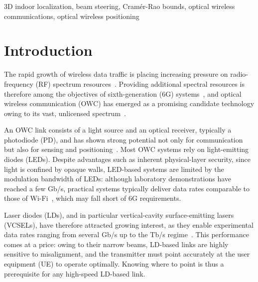 \documentclass[journal]{IEEEtran}
\begin{document}
\begin{IEEEkeywords} 
    3D indoor localization, beam steering, Cramér-Rao bounds, optical wireless communications, optical wireless positioning
\end{IEEEkeywords}


\section{Introduction}

The rapid growth of wireless data traffic is placing increasing
pressure on radio-frequency (RF) spectrum resources~\cite{Koonen2018}.
Providing additional spectral resources
is therefore among the objectives of sixth-generation (6G)
systems~\cite{Trevlakis2023}, and optical wireless communication (OWC) has
emerged as a promising candidate technology owing to its vast, unlicensed
spectrum~\cite{Kahn1997}.

An OWC link consists of a light source and an optical receiver, typically
a photodiode (PD), and has shown strong potential not only for
communication but also for sensing and
positioning~\cite{Zhu2025,Wang2024b}. Most OWC systems rely on
light-emitting diodes (LEDs). Despite advantages such as inherent
physical-layer security, since light is confined by opaque walls,
LED-based systems are limited by the modulation bandwidth of LEDs:
although laboratory demonstrations have reached a few Gb/s, practical
systems typically deliver data rates comparable to those of
Wi-Fi~\cite{Haas:16}, which may fall short of 6G requirements.

Laser diodes (LDs), and in particular vertical-cavity surface-emitting
lasers (VCSELs), have therefore attracted growing interest, as they enable
experimental data rates ranging from several Gb/s up to the Tb/s
regime~\cite{Hu2024,Sarbazi2020,Kazemi_GoB}. This performance comes at a price: owing
to their narrow beams, LD-based links are highly sensitive to
misalignment, and the transmitter must point accurately at the user
equipment (UE) to operate optimally. Knowing where to point is thus
a prerequisite for any high-speed LD-based link.
\end{document}
